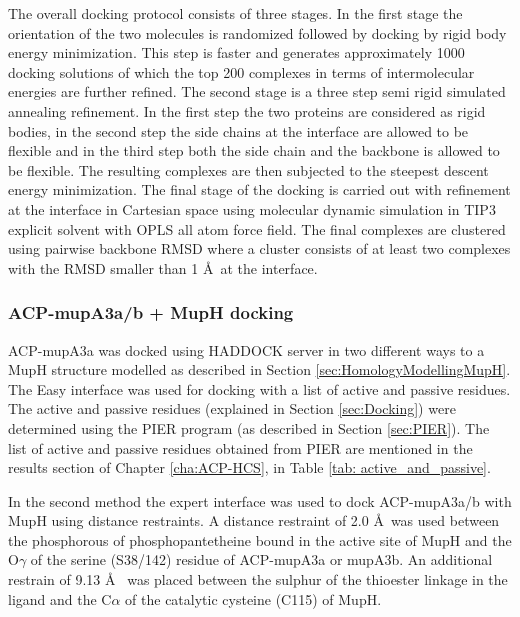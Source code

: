 		The overall docking protocol consists of three stages. In the first stage the orientation of the two molecules is randomized followed by docking by rigid body energy minimization. This step is faster and generates approximately 1000 docking solutions of which the top 200 complexes in terms of intermolecular energies are further refined. The second stage is a three step semi rigid simulated annealing refinement. In the first step the two proteins are considered as rigid bodies, in the second step the side chains at the interface are allowed to be flexible and in the third step both the side chain and the backbone is allowed to be flexible. The resulting complexes are then subjected to the steepest descent energy minimization. The final stage of the docking is carried out with refinement at the interface in Cartesian space using molecular dynamic simulation in TIP3 explicit solvent with OPLS all atom force field. The final complexes are clustered using pairwise backbone RMSD  where a cluster consists of at least two complexes with the RMSD smaller than 1 \AA \ at the interface.  %
		
			\subsubsection{ACP-mupA3a/b + MupH docking}
			\label{sec:acpMuphDocking}
			ACP-mupA3a was docked using HADDOCK server in two different ways to a MupH structure modelled as described in Section \ref{sec:HomologyModellingMupH}. The Easy interface was used for docking with a list of active and passive residues. The active and passive residues (explained in Section \ref{sec:Docking}) were determined using the PIER program (as described in Section \ref{sec:PIER}). The list of active and passive residues obtained from PIER are mentioned in the results section of Chapter \ref{cha:ACP-HCS}, in Table \ref{tab: active_and_passive}.
			
			In the second method the expert interface was used to dock ACP-mupA3a/b with MupH using distance restraints. A distance restraint of 2.0 \AA \ was used between the phosphorous of phosphopantetheine bound in the active site of MupH and the O$ \gamma $ of the serine (S38/142) residue of ACP-mupA3a or mupA3b. An additional restrain of 9.13 \AA \ \parencite{Steussy2005} was placed between the sulphur of the thioester linkage in the ligand and the C$ \alpha $ of the catalytic cysteine (C115) of MupH.
			
